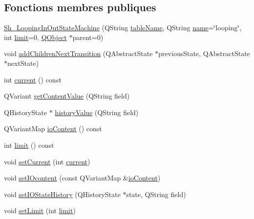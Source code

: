 \subsection*{Fonctions membres publiques}
\begin{DoxyCompactItemize}
\item 
\hyperlink{classSh__LoopingInOutStateMachine_a5de32ba5bb4fd034036a16665f91cdb4}{Sh\-\_\-\-Looping\-In\-Out\-State\-Machine} (Q\-String \hyperlink{classSH__InOutStateMachine_a18b07a985695100612bbcbda870933b4}{table\-Name}, Q\-String \hyperlink{classSH__NamedObject_a970f265df31b28b2179bbbceb6170ac2}{name}=\char`\"{}looping\char`\"{}, int \hyperlink{classSh__LoopingInOutStateMachine_aea47cac4b5f895ba85604cdce1160ccd}{limit}=0, \hyperlink{classQObject}{Q\-Object} $\ast$parent=0)
\item 
void \hyperlink{classSh__LoopingInOutStateMachine_acfd8d0711c793b13c759f6c50be6a315}{add\-Children\-Next\-Transition} (Q\-Abstract\-State $\ast$previous\-State, Q\-Abstract\-State $\ast$next\-State)
\item 
int \hyperlink{classSh__LoopingInOutStateMachine_a1b4661f92617e9cdbacc1be354f2a54a}{current} () const 
\item 
Q\-Variant \hyperlink{classSH__InOutStateMachine_a2cdd914f1e597ac52d021106eec75c89}{get\-Content\-Value} (Q\-String field)
\item 
Q\-History\-State $\ast$ \hyperlink{classSH__InOutStateMachine_a84fb2b2c2105cae9c590c0d15960854a}{history\-Value} (Q\-String field)
\item 
Q\-Variant\-Map \hyperlink{classSH__InOutStateMachine_a79b456cb2e353cb61ef9fe19c97fc8fb}{io\-Content} () const 
\item 
int \hyperlink{classSh__LoopingInOutStateMachine_ac44b7158256f09b878c8958cf3ae3bf8}{limit} () const 
\item 
void \hyperlink{classSh__LoopingInOutStateMachine_ac94dde3e948b7b86a575e421cce2b9ba}{set\-Current} (int \hyperlink{classSh__LoopingInOutStateMachine_a1b4661f92617e9cdbacc1be354f2a54a}{current})
\item 
void \hyperlink{classSH__InOutStateMachine_a23a925522339132a51d16a7cff9074b9}{set\-I\-Ocontent} (const Q\-Variant\-Map \&\hyperlink{classSH__InOutStateMachine_a79b456cb2e353cb61ef9fe19c97fc8fb}{io\-Content})
\item 
void \hyperlink{classSH__InOutStateMachine_a4b72e6da839782a211692a4d728c3925}{set\-I\-O\-State\-History} (Q\-History\-State $\ast$state, Q\-String field)
\item 
void \hyperlink{classSh__LoopingInOutStateMachine_ab5e9ac94cbd9a47a45dcb50e777c398b}{set\-Limit} (int \hyperlink{classSh__LoopingInOutStateMachine_aea47cac4b5f895ba85604cdce1160ccd}{limit})

\end{DoxyCompactItemize}
